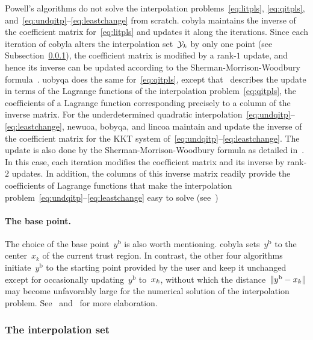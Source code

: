 \documentclass[manuscript,screen,review]{acmart}
\numberwithin{equation}{section}
\newcommand*{\base}{{\text{b}}}
\newcommand*{\iter}[1][k]{x\ifthenelse{\equal{#1}{}}{}{_{#1}}}
\newcommand*{\norm}[2][]{#1\lVert#2#1\rVert}
\newcommand*{\xpt}[1][k]{\mathcal{Y}\ifthenelse{\equal{#1}{}}{}{_{#1}}}
\begin{document}
Powell's algorithms do not solve the interpolation problems~\eqref{eq:litpls}, \eqref{eq:qitpls}, and~\mbox{\eqref{eq:undqitp}--\eqref{eq:leastchange}} from scratch.
\Gls{cobyla} maintains the inverse of the coefficient matrix for~\eqref{eq:litpls} and updates it along the iterations.
Since each iteration of \gls{cobyla} alters the interpolation set~$\xpt$ by only one point (see Subsection~\ref{subsec:iptset}), the coefficient matrix is modified by a rank-$1$ update, and hence its inverse can be updated according to the Sherman-Morrison-Woodbury formula~\cite{Hager_1989}.
\Gls{uobyqa} does the same for~\eqref{eq:qitpls}, except that~\cite[\S~4]{Powell_2002} describes the update in terms of the Lagrange functions of the interpolation problem~\eqref{eq:qitpls}, the coefficients of a Lagrange function corresponding precisely to a column of the inverse matrix.
For the underdetermined quadratic interpolation~\mbox{\eqref{eq:undqitp}--\eqref{eq:leastchange}}, \gls{newuoa}, \gls{bobyqa}, and \gls{lincoa} maintain and update the inverse of the coefficient matrix for the KKT system of~\mbox{\eqref{eq:undqitp}--\eqref{eq:leastchange}}.
The update is also done by the Sherman-Morrison-Woodbury formula as detailed in~\cite[\S~2]{Powell_2004c}.
In this case, each iteration modifies the coefficient matrix and its inverse by rank-$2$ updates.
In addition, the columns of this inverse matrix readily provide the coefficients of Lagrange functions that make the interpolation problem~\mbox{\eqref{eq:undqitp}--\eqref{eq:leastchange}} easy to solve (see~\cite[\S~3]{Powell_2004b})

\paragraph{\textnormal{\textbf{The base point.}}}

The choice of the base point~$y^{\base}$ is also worth mentioning.
\Gls{cobyla} sets~$y^{\base}$ to the center~$x_k$ of the current trust region.
In contrast, the other four algorithms initiate~$y^{\base}$ to the starting point provided by the user and keep it unchanged except for occasionally updating~$y^{\base}$ to~$\iter$, without which the distance~$\norm{y^{\base}-\iter}$ may become unfavorably large for the numerical solution of the interpolation problem.
See~\cite[\S~5]{Powell_2004b} and~\cite[\S~7]{Powell_2006} for more elaboration.

\subsubsection{The interpolation set}
\label{subsec:iptset}
\end{document}
